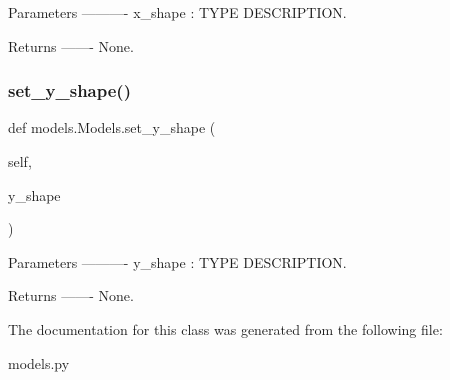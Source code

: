 \begin{DoxyVerb}Parameters
----------
x_shape : TYPE
    DESCRIPTION.

Returns
-------
None.\end{DoxyVerb}
 \mbox{\label{classmodels_1_1Models_a1a6e98441b743361bc53da03ccc4ac19}} 
\subsubsection{\texorpdfstring{set\+\_\+y\+\_\+shape()}{set\_y\_shape()}}
{\footnotesize\ttfamily def models.\+Models.\+set\+\_\+y\+\_\+shape (\begin{DoxyParamCaption}\item[{}]{self,  }\item[{}]{y\+\_\+shape }\end{DoxyParamCaption})}

\begin{DoxyVerb}Parameters
----------
y_shape : TYPE
    DESCRIPTION.

Returns
-------
None.\end{DoxyVerb}
 

The documentation for this class was generated from the following file\+:\begin{DoxyCompactItemize}
\item 
models.\+py\end{DoxyCompactItemize}
